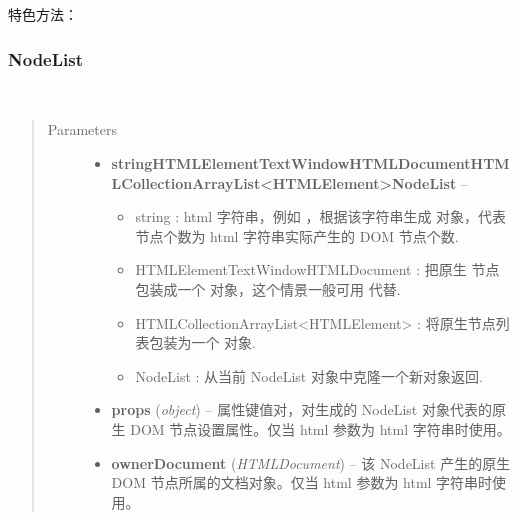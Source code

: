 \documentclass[letterpaper,10pt,english]{sphinxmanual}
\begin{document}
特色方法：


\subsubsection{NodeList}
\label{api/core/node/nodelist:nodelist}\label{api/core/node/nodelist::doc}

\begin{fulllineitems}
\label{api/core/node/nodelist:Node.NodeList}~\begin{quote}\begin{description}
\item[{Parameters}] \leavevmode\begin{itemize}
\item {}
\textbf{string\textbar{}HTMLElement\textbar{}Text\textbar{}Window\textbar{}HTMLDocument\textbar{}HTMLCollection\textbar{}ArrayList\textless{}HTMLElement\textgreater{}\textbar{}NodeList} -- \begin{itemize}
\item {}
string : html 字符串，例如  ，根据该字符串生成  对象，代表节点个数为 html 字符串实际产生的 DOM 节点个数.

\item {}
HTMLElement\textbar{}Text\textbar{}Window\textbar{}HTMLDocument : 把原生  节点包装成一个  对象，这个情景一般可用  代替.

\item {}
HTMLCollection\textbar{}ArrayList\textless{}HTMLElement\textgreater{} : 将原生节点列表包装为一个  对象.

\item {}
NodeList : 从当前 NodeList 对象中克隆一个新对象返回.

\end{itemize}


\item {}
\textbf{props} (\emph{object}) -- 属性键值对，对生成的 NodeList 对象代表的原生 DOM 节点设置属性。仅当 html 参数为 html 字符串时使用。

\item {}
\textbf{ownerDocument} (\emph{HTMLDocument}) -- 该 NodeList 产生的原生 DOM 节点所属的文档对象。仅当 html 参数为 html 字符串时使用。

\end{itemize}

\end{description}\end{quote}

\end{fulllineitems}
\end{document}
